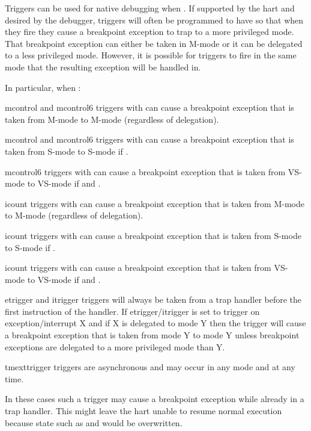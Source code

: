 \begin{commentary}
Triggers can be used for native debugging when .
If supported by the hart and desired by the debugger, triggers will often be
programmed to have  so that when they fire they cause a
breakpoint exception to trap to a more privileged mode. That breakpoint
exception can either be taken in M-mode or it can be delegated to a less
privileged mode. However, it is possible for triggers to fire in the same
mode that the resulting exception will be handled in.

\begin{steps}{In particular, when :}
\item mcontrol and mcontrol6 triggers with  can cause a
breakpoint exception that is taken from M-mode to M-mode (regardless of
delegation).
\item mcontrol and mcontrol6 triggers with  can cause a
breakpoint exception that is taken from S-mode to S-mode if .
\item mcontrol6 triggers with  can cause a
breakpoint exception that is taken from VS-mode to VS-mode if 
and .
\item icount triggers with  can cause a
breakpoint exception that is taken from M-mode to M-mode (regardless of
delegation).
\item icount triggers with  can cause a
breakpoint exception that is taken from S-mode to S-mode if .
\item icount triggers with  can cause a
breakpoint exception that is taken from VS-mode to VS-mode if 
and .
\item etrigger and itrigger triggers will always be taken from a trap handler
before the first instruction of the handler.  If etrigger/itrigger is set to
trigger on exception/interrupt X and if X is delegated to mode Y then the
trigger will cause a breakpoint exception that is taken from mode Y to mode
Y unless breakpoint exceptions are delegated to a more privileged mode than Y.
\item tmexttrigger triggers are asynchronous and may occur in any mode and
at any time.
\end{steps}

In these cases such a trigger may cause a breakpoint exception while already
in a trap handler. This might leave the hart unable to resume normal execution
because state such as \Rmcause and \Rmepc would be overwritten.
\end{commentary}

